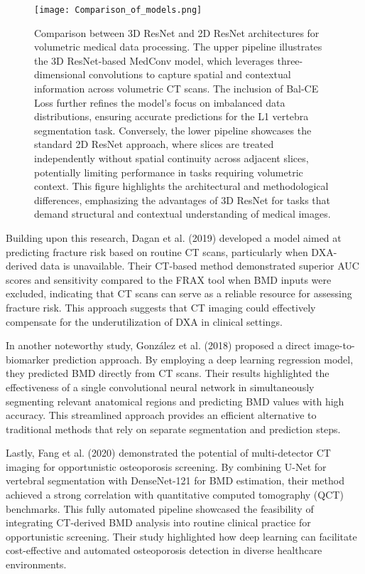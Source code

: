 \begin{figure}[t]
    \centering
    \texttt{[image: Comparison\_of\_models.png]}
    \caption{
        Comparison between 3D ResNet and 2D ResNet architectures for volumetric medical data processing. 
        The upper pipeline illustrates the 3D ResNet-based MedConv model, which leverages three-dimensional convolutions to capture spatial and contextual information across volumetric CT scans. 
        The inclusion of Bal-CE Loss further refines the model's focus on imbalanced data distributions, ensuring accurate predictions for the L1 vertebra segmentation task.
        Conversely, the lower pipeline showcases the standard 2D ResNet approach, where slices are treated independently without spatial continuity across adjacent slices, potentially limiting performance in tasks requiring volumetric context. 
        This figure highlights the architectural and methodological differences, emphasizing the advantages of 3D ResNet for tasks that demand structural and contextual understanding of medical images.}
    \label{fig:comparison_models}
\end{figure}

Building upon this research, Dagan et al. (2019) \cite{dagan2020automated} developed a model aimed at predicting fracture risk based on routine CT scans, particularly when DXA-derived data is unavailable. Their CT-based method demonstrated superior AUC scores and sensitivity compared to the FRAX tool when BMD inputs were excluded, indicating that CT scans can serve as a reliable resource for assessing fracture risk. This approach suggests that CT imaging could effectively compensate for the underutilization of DXA in clinical settings.

In another noteworthy study, González et al. (2018) \cite{gonzalez2018deep} proposed a direct image-to-biomarker prediction approach. By employing a deep learning regression model, they predicted BMD directly from CT scans. Their results highlighted the effectiveness of a single convolutional neural network in simultaneously segmenting relevant anatomical regions and predicting BMD values with high accuracy. This streamlined approach provides an efficient alternative to traditional methods that rely on separate segmentation and prediction steps.

Lastly, Fang et al. (2020) \cite{fang2021opportunistic} demonstrated the potential of multi-detector CT imaging for opportunistic osteoporosis screening. By combining U-Net for vertebral segmentation with DenseNet-121 for BMD estimation, their method achieved a strong correlation with quantitative computed tomography (QCT) benchmarks. This fully automated pipeline showcased the feasibility of integrating CT-derived BMD analysis into routine clinical practice for opportunistic screening. Their study highlighted how deep learning can facilitate cost-effective and automated osteoporosis detection in diverse healthcare environments.


